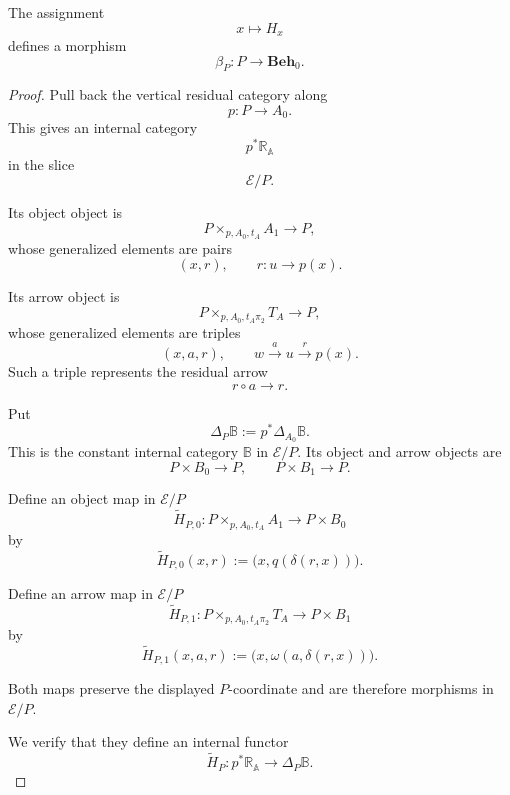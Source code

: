 \begin{lemma}
\label{lem:internal-construction-beta}
    The assignment
    \[
        x\longmapsto H_x
    \]
    defines a morphism
    \[
        \beta_P:P\to\mathbf{Beh}_0.
    \]
\end{lemma}
\begin{proof}
    Pull back the vertical residual category along
    \[
        p:P\to A_0.
    \]
    This gives an internal category
    \[
        p^*\mathbb R_{\mathbb A}
    \]
    in the slice
    \[
        \mathcal E/P.
    \]

    Its object object is
    \[
        P\times_{p,A_0,t_A}A_1
        \longrightarrow
        P,
    \]
    whose generalized elements are pairs
    \[
        (x,r),
        \qquad
        r:u\to p(x).
    \]

    Its arrow object is
    \[
        P\times_{p,A_0,t_A\pi_2}T_A
        \longrightarrow
        P,
    \]
    whose generalized elements are triples
    \[
        (x,a,r),
        \qquad
        w\xrightarrow{a}u\xrightarrow{r}p(x).
    \]
    Such a triple represents the residual arrow
    \[
        r\circ a\longrightarrow r.
    \]

    Put
    \[
        \Delta_P\mathbb B
        :=
        p^*\Delta_{A_0}\mathbb B.
    \]
    This is the constant internal category \(\mathbb B\) in
    \(\mathcal E/P\). Its object and arrow objects are
    \[
        P\times B_0\longrightarrow P,
        \qquad
        P\times B_1\longrightarrow P.
    \]

    Define an object map in \(\mathcal E/P\)
    \[
        \widetilde H_{P,0}:
        P\times_{p,A_0,t_A}A_1
        \longrightarrow
        P\times B_0
    \]
    by
    \[
        \widetilde H_{P,0}(x,r)
        :=
        \bigl(
            x,
            q(\delta(r,x))
        \bigr).
    \]

    Define an arrow map in \(\mathcal E/P\)
    \[
        \widetilde H_{P,1}:
        P\times_{p,A_0,t_A\pi_2}T_A
        \longrightarrow
        P\times B_1
    \]
    by
    \[
        \widetilde H_{P,1}(x,a,r)
        :=
        \bigl(
            x,
            \omega(a,\delta(r,x))
        \bigr).
    \]

    Both maps preserve the displayed \(P\)-coordinate and are therefore
    morphisms in \(\mathcal E/P\).

    We verify that they define an internal functor
    \[
        \widetilde H_P:
        p^*\mathbb R_{\mathbb A}
        \longrightarrow
        \Delta_P\mathbb B.
    \]


\end{proof}
